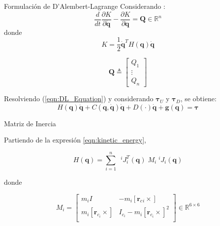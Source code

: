 \begin{frame}{Formulación de D'Alembert-Lagrange}
    Considerando \cite{3DMotion}:
    \begin{equation} 
        \label{eqn:DL_Equation}
         \frac{d}{dt} \frac{\partial K}{\partial \boldsymbol{\dot{q}}} - \frac{\partial K}{\partial \boldsymbol{q}} = \boldsymbol{Q}
         \in \mathbb{R}^n
    \end{equation}
    donde
    \begin{equation}
        \label{eqn:kinetic_energy}
         K = \frac{1}{2} \boldsymbol{\dot{q}}^T H(\boldsymbol{q}) \boldsymbol{\dot{q}}
    \end{equation}
    
    \begin{equation}
        \label{eqn:fuerzas_generalizadas}
         \boldsymbol{Q} \triangleq \begin{bmatrix} Q_1 \\ \vdots \\ Q_n \end{bmatrix}
    \end{equation}
    
    Resolviendo (\ref{eqn:DL_Equation}) y considerando $\boldsymbol{\tau}_U$ y $\boldsymbol{\tau}_D$, se obtiene:
    \begin{equation}
        \label{eqn:DL_final}
        H(\boldsymbol{q}) \boldsymbol{\ddot{q}} + C(\boldsymbol{q}, \boldsymbol{\dot{q}}) \boldsymbol{\dot{q}} + D(\cdot)\boldsymbol{\dot{q}}
        + \boldsymbol{g}(\boldsymbol{q}) = \boldsymbol{\tau}
    \end{equation}
\end{frame}

\begin{frame}{Matriz de Inercia}

    Partiendo de la expresión \eqref{eqn:kinetic_energy},
    
    \begin{equation}
        \label{eqn:inertia_matrix}
        H(\boldsymbol{q}) = \sum_{i=1}^n \ \; ^iJ_i^T(\boldsymbol{q}) \; M_i \; ^iJ_i(\boldsymbol{q}) 
    \end{equation}

    donde

    \begin{equation}
        \label{eqn:matriz_const} M_i = 
        \begin{bmatrix}
            m_i I & -m_i[\boldsymbol{r}_c{}_i \times] \\
            m_i[\boldsymbol{r}_{c_i} \times] & I_{c_i} -m_i[\boldsymbol{r}_{c_i} \times]^2\\
        \end{bmatrix}\in \mathbb{R}^{6\times6}
    \end{equation}
\end{frame}

